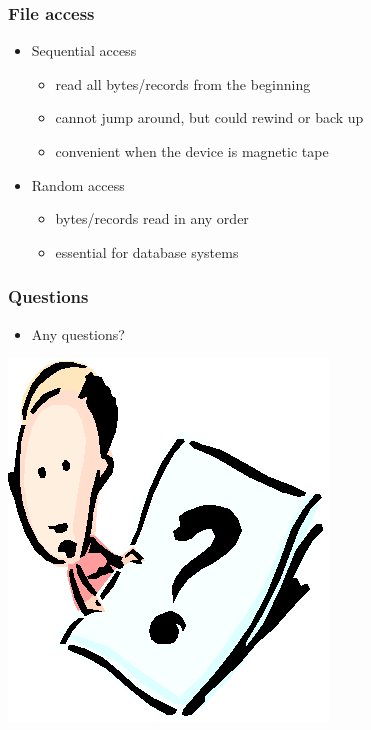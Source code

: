 \documentclass[CJKutf8,xcolor=pdftex,dvipsnames,table]{beamer}
\begin{document}
\begin{CJK*}{UTF8}{song}
  \begin{frame}
    \frametitle{File access} \pause
    \begin{itemize}
    \item Sequential access \pause
      \begin{itemize}
      \item read all bytes/records from the beginning \pause
      \item cannot jump around, but could rewind or back up \pause
      \item convenient when the device is magnetic tape\pause
      \end{itemize}
    \item Random access \pause
      \begin{itemize}
      \item bytes/records read in any order \pause
      \item essential for database systems
      \end{itemize}
    \end{itemize}
  \end{frame}

  \begin{frame}
    \frametitle{Questions}
    \begin{itemize}
    \item Any questions?
    \end{itemize}
    \begin{center}
      \includegraphics[scale=.5]{question}
    \end{center}
  \end{frame}


\end{CJK*}
\end{document}
